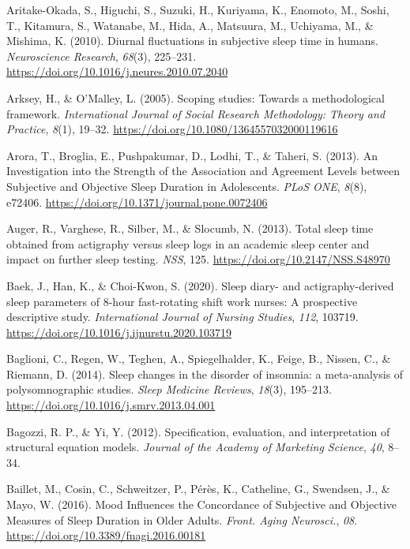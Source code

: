 \documentclass[
]{article}
\newlength{\cslhangindent}
\newenvironment{CSLReferences}[2] %
 {\begin{list}{}{%
  \setlength{\itemindent}{0pt}
  \setlength{\leftmargin}{0pt}
  \setlength{\parsep}{0pt}
  \ifodd #1
   \setlength{\leftmargin}{\cslhangindent}
   \setlength{\itemindent}{-1\cslhangindent}
  \fi
  \setlength{\itemsep}{#2\baselineskip}}}
 {\end{list}}
\begin{document}
\begin{CSLReferences}{1}{0}
Aritake-Okada, S., Higuchi, S., Suzuki, H., Kuriyama, K., Enomoto, M., Soshi, T., Kitamura, S., Watanabe, M., Hida, A., Matsuura, M., Uchiyama, M., \& Mishima, K. (2010). Diurnal fluctuations in subjective sleep time in humans. \emph{Neuroscience Research}, \emph{68}(3), 225--231. \url{https://doi.org/10.1016/j.neures.2010.07.2040}

Arksey, H., \& O'Malley, L. (2005). {Scoping studies: Towards a methodological framework}. \emph{International Journal of Social Research Methodology: Theory and Practice}, \emph{8}(1), 19--32. \url{https://doi.org/10.1080/1364557032000119616}

Arora, T., Broglia, E., Pushpakumar, D., Lodhi, T., \& Taheri, S. (2013). An {Investigation} into the {Strength} of the {Association} and {Agreement} {Levels} between {Subjective} and {Objective} {Sleep} {Duration} in {Adolescents}. \emph{PLoS ONE}, \emph{8}(8), e72406. \url{https://doi.org/10.1371/journal.pone.0072406}

Auger, R., Varghese, R., Silber, M., \& Slocumb, N. (2013). Total sleep time obtained from actigraphy versus sleep logs in an academic sleep center and impact on further sleep testing. \emph{NSS}, 125. \url{https://doi.org/10.2147/NSS.S48970}

Baek, J., Han, K., \& Choi-Kwon, S. (2020). Sleep diary- and actigraphy-derived sleep parameters of 8-hour fast-rotating shift work nurses: {A} prospective descriptive study. \emph{International Journal of Nursing Studies}, \emph{112}, 103719. \url{https://doi.org/10.1016/j.ijnurstu.2020.103719}

Baglioni, C., Regen, W., Teghen, A., Spiegelhalder, K., Feige, B., Nissen, C., \& Riemann, D. (2014). {Sleep changes in the disorder of insomnia: a meta-analysis of polysomnographic studies}. \emph{Sleep Medicine Reviews}, \emph{18}(3), 195--213. \url{https://doi.org/10.1016/j.smrv.2013.04.001}

Bagozzi, R. P., \& Yi, Y. (2012). Specification, evaluation, and interpretation of structural equation models. \emph{Journal of the Academy of Marketing Science}, \emph{40}, 8--34.

Baillet, M., Cosin, C., Schweitzer, P., Pérès, K., Catheline, G., Swendsen, J., \& Mayo, W. (2016). Mood {Influences} the {Concordance} of {Subjective} and {Objective} {Measures} of {Sleep} {Duration} in {Older} {Adults}. \emph{Front. Aging Neurosci.}, \emph{08}. \url{https://doi.org/10.3389/fnagi.2016.00181}


\end{CSLReferences}
\end{document}
